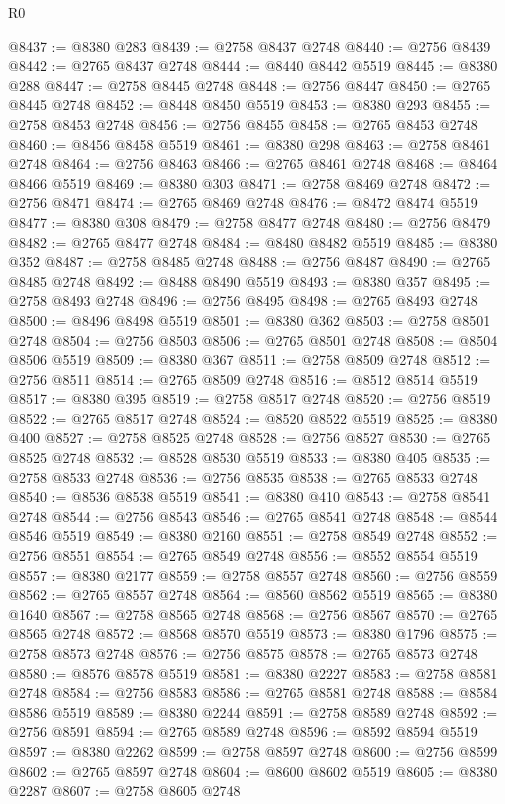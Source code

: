 \begin{lexlean}{R0}
\begin{coremodule}
@8437 := @8380 @283
@8439 := @2758 @8437 @2748
@8440 := @2756 @8439
@8442 := @2765 @8437 @2748
@8444 := @8440 @8442 @5519
@8445 := @8380 @288
@8447 := @2758 @8445 @2748
@8448 := @2756 @8447
@8450 := @2765 @8445 @2748
@8452 := @8448 @8450 @5519
@8453 := @8380 @293
@8455 := @2758 @8453 @2748
@8456 := @2756 @8455
@8458 := @2765 @8453 @2748
@8460 := @8456 @8458 @5519
@8461 := @8380 @298
@8463 := @2758 @8461 @2748
@8464 := @2756 @8463
@8466 := @2765 @8461 @2748
@8468 := @8464 @8466 @5519
@8469 := @8380 @303
@8471 := @2758 @8469 @2748
@8472 := @2756 @8471
@8474 := @2765 @8469 @2748
@8476 := @8472 @8474 @5519
@8477 := @8380 @308
@8479 := @2758 @8477 @2748
@8480 := @2756 @8479
@8482 := @2765 @8477 @2748
@8484 := @8480 @8482 @5519
@8485 := @8380 @352
@8487 := @2758 @8485 @2748
@8488 := @2756 @8487
@8490 := @2765 @8485 @2748
@8492 := @8488 @8490 @5519
@8493 := @8380 @357
@8495 := @2758 @8493 @2748
@8496 := @2756 @8495
@8498 := @2765 @8493 @2748
@8500 := @8496 @8498 @5519
@8501 := @8380 @362
@8503 := @2758 @8501 @2748
@8504 := @2756 @8503
@8506 := @2765 @8501 @2748
@8508 := @8504 @8506 @5519
@8509 := @8380 @367
@8511 := @2758 @8509 @2748
@8512 := @2756 @8511
@8514 := @2765 @8509 @2748
@8516 := @8512 @8514 @5519
@8517 := @8380 @395
@8519 := @2758 @8517 @2748
@8520 := @2756 @8519
@8522 := @2765 @8517 @2748
@8524 := @8520 @8522 @5519
@8525 := @8380 @400
@8527 := @2758 @8525 @2748
@8528 := @2756 @8527
@8530 := @2765 @8525 @2748
@8532 := @8528 @8530 @5519
@8533 := @8380 @405
@8535 := @2758 @8533 @2748
@8536 := @2756 @8535
@8538 := @2765 @8533 @2748
@8540 := @8536 @8538 @5519
@8541 := @8380 @410
@8543 := @2758 @8541 @2748
@8544 := @2756 @8543
@8546 := @2765 @8541 @2748
@8548 := @8544 @8546 @5519
@8549 := @8380 @2160
@8551 := @2758 @8549 @2748
@8552 := @2756 @8551
@8554 := @2765 @8549 @2748
@8556 := @8552 @8554 @5519
@8557 := @8380 @2177
@8559 := @2758 @8557 @2748
@8560 := @2756 @8559
@8562 := @2765 @8557 @2748
@8564 := @8560 @8562 @5519
@8565 := @8380 @1640
@8567 := @2758 @8565 @2748
@8568 := @2756 @8567
@8570 := @2765 @8565 @2748
@8572 := @8568 @8570 @5519
@8573 := @8380 @1796
@8575 := @2758 @8573 @2748
@8576 := @2756 @8575
@8578 := @2765 @8573 @2748
@8580 := @8576 @8578 @5519
@8581 := @8380 @2227
@8583 := @2758 @8581 @2748
@8584 := @2756 @8583
@8586 := @2765 @8581 @2748
@8588 := @8584 @8586 @5519
@8589 := @8380 @2244
@8591 := @2758 @8589 @2748
@8592 := @2756 @8591
@8594 := @2765 @8589 @2748
@8596 := @8592 @8594 @5519
@8597 := @8380 @2262
@8599 := @2758 @8597 @2748
@8600 := @2756 @8599
@8602 := @2765 @8597 @2748
@8604 := @8600 @8602 @5519
@8605 := @8380 @2287
@8607 := @2758 @8605 @2748

\end{coremodule}
\end{lexlean}
